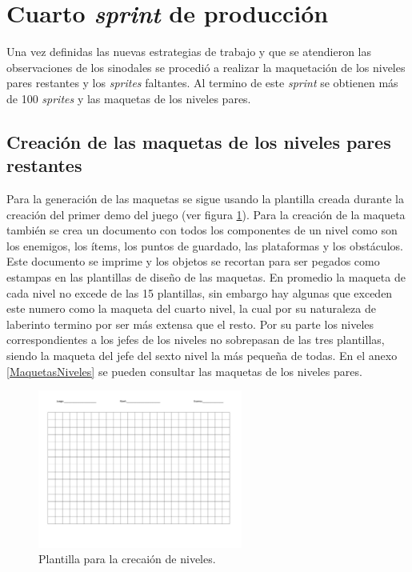 \section{Cuarto \textit{sprint} de producción}
Una vez definidas las nuevas estrategias de trabajo y que se atendieron 
las observaciones de los sinodales se procedió a realizar la maquetación de los 
niveles pares restantes y los \textit{sprites} faltantes. Al termino de este 
\textit{sprint} se obtienen más de 100 \textit{sprites} y las maquetas de los 
niveles pares.

\subsection{Creación de las maquetas de los niveles pares restantes}
Para la generación de las maquetas se sigue usando la plantilla creada durante 
la creación del primer demo del juego (ver figura \ref{fig:MaquetaPlantilla}). 
Para la creación de la maqueta también se crea un documento con todos los 
componentes de un nivel como son los enemigos, los ítems, los puntos de guardado, 
las plataformas y los obstáculos. Este documento se imprime y los objetos se 
recortan para ser pegados como estampas en las plantillas de diseño de las 
maquetas. En promedio la maqueta de cada nivel no excede de las 15 plantillas, 
sin embargo hay algunas que exceden este numero como la maqueta del cuarto nivel, 
la cual por su naturaleza de laberinto termino por ser más extensa que el 
resto. Por su parte los niveles correspondientes a los jefes de los niveles no 
sobrepasan de las tres plantillas, siendo la maqueta del jefe del sexto nivel 
la más pequeña de todas. En el anexo \ref{MaquetasNiveles} se pueden consultar 
las maquetas de los niveles pares.  

\begin{figure}[h]
	\centering
	\includegraphics[width=0.6\textwidth]{03TrabajoRealizado/imagenes/maqueta-1.png}
 	\caption{Plantilla para la crecaión de niveles.}
	\label{fig:MaquetaPlantilla}		
\end{figure}

